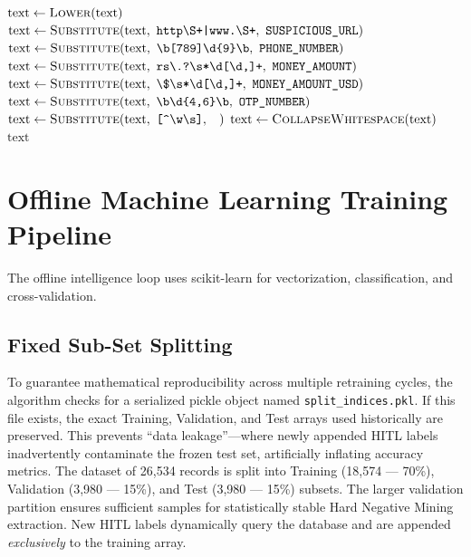 \begin{algorithm}[h]
\caption{Preprocessing and Artifact Neutralization Methodology}\label{alg:artifact}
\begin{algorithmic}[1]
    \State $\text{text} \gets \textsc{Lower}(\text{text})$
    \State $\text{text} \gets \textsc{Substitute}(\text{text},\ \texttt{http\textbackslash S+|www.\textbackslash S+},\ \texttt{SUSPICIOUS\_URL})$
    \State $\text{text} \gets \textsc{Substitute}(\text{text},\ \texttt{\textbackslash b[789]\textbackslash d\{9\}\textbackslash b},\ \texttt{PHONE\_NUMBER})$
    \State $\text{text} \gets \textsc{Substitute}(\text{text},\ \texttt{rs\textbackslash.?\textbackslash s*\textbackslash d[\textbackslash d,]+},\ \texttt{MONEY\_AMOUNT})$
    \State $\text{text} \gets \textsc{Substitute}(\text{text},\ \texttt{\textbackslash \$\textbackslash s*\textbackslash d[\textbackslash d,]+},\ \texttt{MONEY\_AMOUNT\_USD})$
    \State $\text{text} \gets \textsc{Substitute}(\text{text},\ \texttt{\textbackslash b\textbackslash d\{4,6\}\textbackslash b},\ \texttt{OTP\_NUMBER})$
    \State {}
    \State $\text{text} \gets \textsc{Substitute}(\text{text},\ \texttt{[\textasciicircum\textbackslash w\textbackslash s]},\ \texttt{ })$
    \State $\text{text} \gets \textsc{CollapseWhitespace}(\text{text})$
    \State \Return $\text{text}$
\EndFunction
\end{algorithmic}
\end{algorithm}

\section{Offline Machine Learning Training Pipeline}
The offline intelligence loop uses scikit-learn for vectorization, classification, and cross-validation.
\subsection{Fixed Sub-Set Splitting}
To guarantee mathematical reproducibility across multiple retraining cycles, the algorithm checks for a serialized pickle object named \texttt{split\_indices.pkl}. If this file exists, the exact Training, Validation, and Test arrays used historically are preserved. This prevents ``data leakage''---where newly appended HITL labels inadvertently contaminate the frozen test set, artificially inflating accuracy metrics. The dataset of 26,534 records is split into Training (18,574 --- 70\%), Validation (3,980 --- 15\%), and Test (3,980 --- 15\%) subsets. The larger validation partition ensures sufficient samples for statistically stable Hard Negative Mining extraction. New HITL labels dynamically query the database and are appended \textit{exclusively} to the training array.

